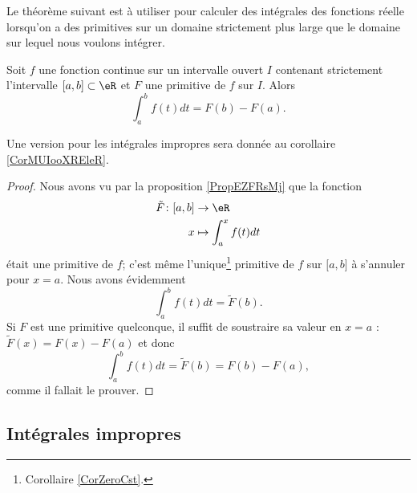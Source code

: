 Le théorème suivant est à utiliser pour calculer des intégrales des fonctions réelle lorsqu'on a des primitives sur un domaine strictement plus large que le domaine sur lequel nous voulons intégrer.
\begin{theorem}    \label{ThoRWXooTqHGbC}
    Soit \( f\) une fonction continue sur un intervalle ouvert \( I\) contenant strictement l'intervalle \( \mathopen[ a , b \mathclose]\subset \eR\) et \( F\) une primitive de \( f\) sur \( I\). Alors
    \begin{equation}
        \int_a^bf(t)dt=F(b)-F(a).
    \end{equation}
\end{theorem}
Une version pour les intégrales impropres sera donnée au corollaire \ref{CorMUIooXREleR}.

\begin{proof}
    Nous avons vu par la proposition \ref{PropEZFRsMj} que la fonction
    \begin{equation}
        \begin{aligned}
            \tilde F\colon \mathopen[ a , b \mathclose]&\to \eR \\
            x&\mapsto  \int_a^xf(t)dt
        \end{aligned}
    \end{equation}
    était une primitive de \( f\); c'est même l'unique\footnote{Corollaire \ref{CorZeroCst}.} primitive de \( f\) sur \( \mathopen[ a , b \mathclose]\) à s'annuler pour \( x=a\). Nous avons évidemment
    \begin{equation}
        \int_a^bf(t)dt=\tilde F(b).
    \end{equation}
    Si \( F\) est une primitive quelconque, il suffit de soustraire sa valeur en \( x=a\) : \( \tilde F(x)=F(x)-F(a)\) et donc
    \begin{equation}
        \int_a^bf(t)dt=\tilde F(b)=F(b)-F(a),
    \end{equation}
    comme il fallait le prouver.
\end{proof}

\subsection{Intégrales impropres}
\label{SecGAVooBOQddU}

